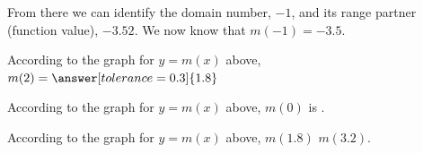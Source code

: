 \documentclass{ximera}
\begin{document}
From there we can identify the domain number, $-1$, and its range partner (function value), $-3.52$. We now know that $m(-1)=-3.5$.




\begin{question} 


According to the graph for $y = m(x)$ above, $m(2) = \answer[tolerance=0.3]{1.8}$

\end{question}



\begin{question} 


According to the graph for $y = m(x)$ above, $m(0)$ is .

\end{question}



\begin{question} 


According to the graph for $y = m(x)$ above, $m(1.8)$  \wordChoice{\choice{$<$}\choice[correct]{$>$}}   $m(3.2)$.

\end{question}
\end{document}
